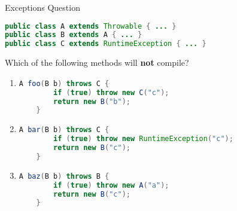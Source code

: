 \documentclass{beamer}
\begin{document}
\begin{frame}[fragile]{Exceptions Question}

\vspace{-.05in}
\begin{lstlisting}[language=Java]
public class A extends Throwable { ... }
public class B extends A { ... }
public class C extends RuntimeException { ... }
\end{lstlisting}
\vspace{-.05in}
Which of the following methods will {\bf not} compile?
\vspace{-.05in}
\begin{enumerate} \itemsep0pt

\item
\begin{lstlisting}[language=Java]
    A foo(B b) throws C {
        if (true) throw new C("c");
        return new B("b");
    }
\end{lstlisting}

\item
\begin{lstlisting}[language=Java]
    A bar(B b) throws C {
        if (true) throw new RuntimeException("c");
        return new B("c");
    }
\end{lstlisting}

\item
\begin{lstlisting}[language=Java]
    A baz(B b) throws B {
        if (true) throw new A("a");
        return new B("c");
    }
\end{lstlisting}


\end{enumerate}


\end{frame}
\end{document}
